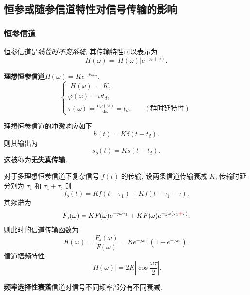 \subsection{恒参或随参信道特性对信号传输的影响}
\subsubsection{恒参信道}
恒参信道是\textit{线性时不变系统}, 其传输特性可以表示为
\begin{equation}
    H(\omega)=|H(\omega)|e^{-j\varphi(\omega)}.
\end{equation}

\textbf{理想恒参信道}\quad $H(\omega)=Ke^{-j\omega t_d}$.
\begin{equation}
    \begin{cases}
        |H(\omega)|=K,              \\
        \varphi(\omega)=\omega t_d, \\
        \tau(\omega)=\frac{\mathrm{d}\varphi(\omega)}{\mathrm{d}\omega}=t_d. \qquad (\text{群时延特性})
    \end{cases}
\end{equation}

理想恒参信道的冲激响应如下
\begin{equation}
    h(t)=K\delta(t-t_d).
\end{equation}
则其输出为
\begin{equation}
    s_o(t)=Ks(t-t_d).
\end{equation}
这被称为\textbf{无失真传输}.

对于多理想恒参信道下复杂信号 $f(t)$ 的传输, 设两条信道传输衰减 $K$, 传输时延分别为 $\tau_1$ 和 $\tau_1+\tau$, 则
\begin{equation}
    f_o(t)=Kf(t-\tau_1)+Kf(t-\tau_1-\tau).
\end{equation}
其频谱为
\begin{equation}
    F_o(\omega)=KF(\omega)e^{-j\omega\tau_1}+KF(\omega)e^{-j\omega(\tau_1{\color{red} +}\tau)}.
\end{equation}
则此时的信道传输函数为
\begin{equation}
    H(\omega)=\frac{F_o(\omega)}{F(\omega)}=Ke^{-j\omega\tau_1}(1+e^{-j\omega\tau}).
\end{equation}
信道幅频特性
\begin{equation}
    |H(\omega)|=2K\left|\cos\frac{\omega\tau}{2}\right|.
\end{equation}

\textbf{频率选择性衰落}\quad 信道对信号不同频率部分有不同衰减.

